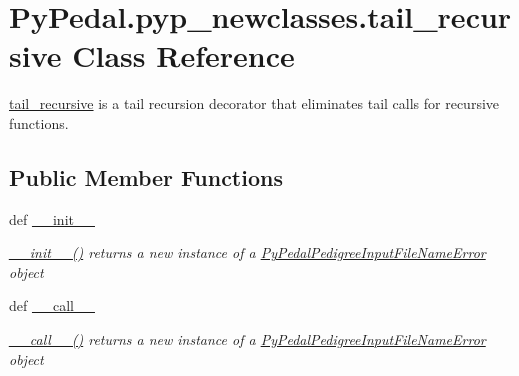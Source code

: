 \hypertarget{classPyPedal_1_1pyp__newclasses_1_1tail__recursive}{
\section{PyPedal.pyp\_\-newclasses.tail\_\-recursive Class Reference}
\label{classPyPedal_1_1pyp__newclasses_1_1tail__recursive}
}


\hyperlink{classPyPedal_1_1pyp__newclasses_1_1tail__recursive}{tail\_\-recursive} is a tail recursion decorator that eliminates tail calls for recursive functions.  


\subsection*{Public Member Functions}
\begin{DoxyCompactItemize}
\item 
def \hyperlink{classPyPedal_1_1pyp__newclasses_1_1tail__recursive_a50ddecd1646c22634b59643e1b06e418}{\_\-\_\-init\_\-\_\-}
\begin{DoxyCompactList}\small\item\em \hyperlink{classPyPedal_1_1pyp__newclasses_1_1tail__recursive_a50ddecd1646c22634b59643e1b06e418}{\_\-\_\-init\_\-\_\-()} returns a new instance of a \hyperlink{classPyPedal_1_1pyp__newclasses_1_1PyPedalPedigreeInputFileNameError}{PyPedalPedigreeInputFileNameError} object \item\end{DoxyCompactList}\item 
def \hyperlink{classPyPedal_1_1pyp__newclasses_1_1tail__recursive_ae196dca0dd4a0cd885af549ebcb57b16}{\_\-\_\-call\_\-\_\-}
\begin{DoxyCompactList}\small\item\em \hyperlink{classPyPedal_1_1pyp__newclasses_1_1tail__recursive_ae196dca0dd4a0cd885af549ebcb57b16}{\_\-\_\-call\_\-\_\-()} returns a new instance of a \hyperlink{classPyPedal_1_1pyp__newclasses_1_1PyPedalPedigreeInputFileNameError}{PyPedalPedigreeInputFileNameError} object \item\end{DoxyCompactList}\end{DoxyCompactItemize}
